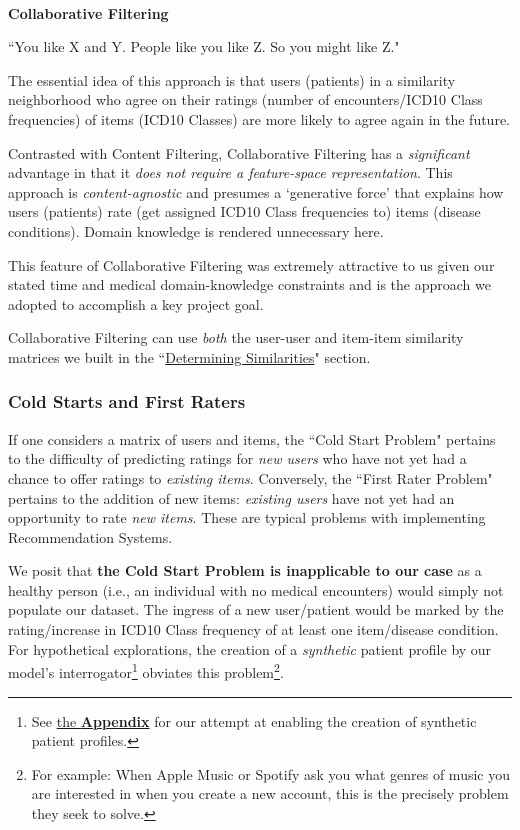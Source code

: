 \documentclass[twoside,11pt]{article}
\begin{document}
\

\textbf{Collaborative Filtering}

\vspace{2em}

\centerline{``You like X and Y. People like you like Z. So you might like Z."}

\vspace{1em}

The essential idea of this approach is that users (patients) in a similarity neighborhood who agree on their ratings (number of encounters/ICD10 Class frequencies) of items (ICD10 Classes) are more likely to agree again in the future.

Contrasted with Content Filtering, Collaborative Filtering has a \textit{significant} advantage in that it \textit{does not require a feature-space representation}. This approach is \textit{content-agnostic} and presumes a `generative force' that explains how users (patients) rate (get assigned ICD10 Class frequencies to) items (disease conditions). Domain knowledge is rendered unnecessary here.

This feature of Collaborative Filtering was extremely attractive to us given our stated time and medical domain-knowledge constraints and is the approach we adopted to accomplish a key project goal.

Collaborative Filtering can use \textit{both} the user-user and item-item similarity matrices we built in the ``\hyperref[section:similarity]{Determining Similarities}" section.


\subsubsection{Cold Starts and First Raters}

If one considers a  matrix of users and items, the ``Cold Start Problem" pertains to the difficulty of predicting ratings for \textit{new users} who have not yet had a chance to offer ratings to \textit{existing items}.  Conversely, the ``First Rater Problem" pertains to the addition of new items: \textit{existing users} have not yet had an opportunity to rate \textit{new items}. These are typical problems with implementing Recommendation Systems.

We posit that \textbf{the Cold Start Problem is inapplicable to our case} as a healthy person (i.e., an individual with no medical encounters) would simply not populate our dataset. The ingress of a new user/patient would be marked by the rating/increase in ICD10 Class frequency of at least one item/disease condition. For hypothetical explorations, the creation of a \textit{synthetic} patient profile by our model's interrogator\footnote{See \hyperref[appendix:websitescreenshots]{the \textbf{Appendix}} for our attempt at enabling the creation of synthetic patient profiles.} obviates this problem\footnote{For example: When Apple Music or Spotify ask you what genres of music you are interested in when you create a new account, this is the precisely problem they seek to solve.}.
\end{document}

